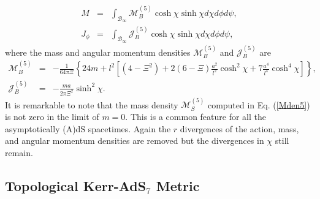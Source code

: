 \documentclass[a4paper,12pt,onecolumn]{revtex4}
\begin{document}
\begin{eqnarray}
M &=&\int_{\mathcal{B}_\infty }\mathcal{M}_B^{(5)}\cosh \chi \sinh \chi
d\chi d\phi d\psi ,  \label{Mt5} \\
J_\phi  &=&\int_{\mathcal{B}_\infty }\mathcal{J}_B^{(5)}\cosh \chi \sinh
\chi d\chi d\phi d\psi ,  \label{Jt5}
\end{eqnarray}
where the mass and angular momentum densities $\mathcal{M}_B^{(5)}$ and $%
\mathcal{J}_B^{(5)}$ are
\begin{eqnarray}
\mathcal{M}_B^{(5)} &=&-\frac 1{64\pi \Xi }\left\{24m+l^2\left[(4-\Xi ^2)+2(6-\Xi )%
\frac{a^2}{l^2}\cosh ^2\chi +7\frac{a^4}{l^4}\cosh ^4\chi
\right]\right\},  \label{Mden5}
\\
\mathcal{J}_B^{(5)} &=&-\frac{ma}{2\pi \Xi ^2}\sinh ^2\chi .  \label{Jden5}
\end{eqnarray}
It is remarkable to note that the mass density
$\mathcal{M}_S^{(5)}$ computed in Eq. (\ref{Mden5}) is not zero in
the limit of $m=0$. This is a common feature for all the
asymptotically (A)dS spacetimes. Again the $r$ divergences of the
action, mass, and angular momentum densities are removed but the
divergences in $\chi $ still remain.

\subsection{Topological Kerr-AdS$_7$ Metric}
\end{document}
